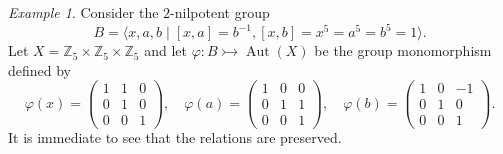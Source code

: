 \documentclass[reqno,hidelinks,a4paper]{amsart}
\theoremstyle{plain}
\theoremstyle{definition}
\theoremstyle{remark}
\newtheorem{example}[subsection]{Example}
\numberwithin{equation}{section}
\newcommand{\Z}{\mathbb{Z}}
\DeclareMathOperator{\Aut}{Aut}
\begin{document}
\begin{example}
    Consider the \(2\)-nilpotent group
    \[
        B = \langle x, a, b \mid [x, a]=b^{-1}, [x, b] = x^5 = a^5 = b^5=1 \rangle.
    \]
    Let \(X=\Z_5 \times \Z_5 \times \Z_5\) and let \(\varphi \colon B \rightarrowtail \Aut(X)\) be the group monomorphism defined by
    \[
        \varphi(x) =
        \begin{pmatrix}
            1 & 1 & 0 \\
            0 & 1 & 0 \\
            0 & 0 & 1
        \end{pmatrix}, \quad
        \varphi(a) =
        \begin{pmatrix}
            1 & 0 & 0 \\
            0 & 1 & 1 \\
            0 & 0 & 1
        \end{pmatrix}, \quad
        \varphi(b)=
        \begin{pmatrix}
            1 & 0 & -1 \\
            0 & 1 & 0  \\
            0 & 0 & 1
        \end{pmatrix}.
    \]
    It is immediate to see that the relations are preserved.


\end{example}
\end{document}
